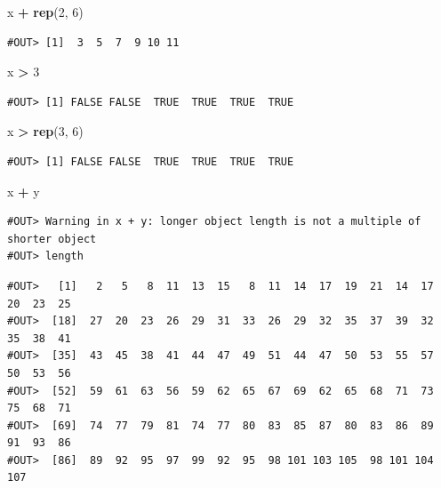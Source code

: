 \documentclass[]{book}
\newenvironment{Shaded}{\begin{snugshade}}{\end{snugshade}}
\newcommand{\KeywordTok}[1]{\textcolor[rgb]{0.13,0.29,0.53}{\textbf{#1}}}
\newcommand{\DecValTok}[1]{\textcolor[rgb]{0.00,0.00,0.81}{#1}}
\newcommand{\StringTok}[1]{\textcolor[rgb]{0.31,0.60,0.02}{#1}}
\newcommand{\OperatorTok}[1]{\textcolor[rgb]{0.81,0.36,0.00}{\textbf{#1}}}
\newcommand{\NormalTok}[1]{#1}
\theoremstyle{definition}
\theoremstyle{definition}
\theoremstyle{definition}
\theoremstyle{remark}
\begin{document}
\begin{Shaded}
\begin{Highlighting}[]
\NormalTok{x }\OperatorTok{+}\StringTok{ }\KeywordTok{rep}\NormalTok{(}\DecValTok{2}\NormalTok{, }\DecValTok{6}\NormalTok{)}
\end{Highlighting}
\end{Shaded}

\begin{verbatim}
#OUT> [1]  3  5  7  9 10 11
\end{verbatim}

\begin{Shaded}
\begin{Highlighting}[]
\NormalTok{x }\OperatorTok{>}\StringTok{ }\DecValTok{3}
\end{Highlighting}
\end{Shaded}

\begin{verbatim}
#OUT> [1] FALSE FALSE  TRUE  TRUE  TRUE  TRUE
\end{verbatim}

\begin{Shaded}
\begin{Highlighting}[]
\NormalTok{x }\OperatorTok{>}\StringTok{ }\KeywordTok{rep}\NormalTok{(}\DecValTok{3}\NormalTok{, }\DecValTok{6}\NormalTok{)}
\end{Highlighting}
\end{Shaded}

\begin{verbatim}
#OUT> [1] FALSE FALSE  TRUE  TRUE  TRUE  TRUE
\end{verbatim}

\begin{Shaded}
\begin{Highlighting}[]
\NormalTok{x }\OperatorTok{+}\StringTok{ }\NormalTok{y}
\end{Highlighting}
\end{Shaded}

\begin{verbatim}
#OUT> Warning in x + y: longer object length is not a multiple of shorter object
#OUT> length
\end{verbatim}

\begin{verbatim}
#OUT>   [1]   2   5   8  11  13  15   8  11  14  17  19  21  14  17  20  23  25
#OUT>  [18]  27  20  23  26  29  31  33  26  29  32  35  37  39  32  35  38  41
#OUT>  [35]  43  45  38  41  44  47  49  51  44  47  50  53  55  57  50  53  56
#OUT>  [52]  59  61  63  56  59  62  65  67  69  62  65  68  71  73  75  68  71
#OUT>  [69]  74  77  79  81  74  77  80  83  85  87  80  83  86  89  91  93  86
#OUT>  [86]  89  92  95  97  99  92  95  98 101 103 105  98 101 104 107
\end{verbatim}
\end{document}
